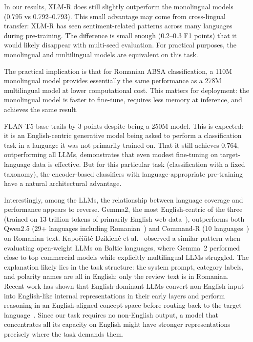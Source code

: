 \documentclass[12pt,a4paper]{report}
\begin{document}
In our results, XLM-R does still slightly outperform the monolingual models (0.795 vs 0.792--0.793). This small advantage may come from cross-lingual transfer: XLM-R has seen sentiment-related patterns across many languages during pre-training. The difference is small enough (0.2--0.3 F1 points) that it would likely disappear with multi-seed evaluation. For practical purposes, the monolingual and multilingual models are equivalent on this task.

The practical implication is that for Romanian ABSA classification, a 110M monolingual model provides essentially the same performance as a 278M multilingual model at lower computational cost. This matters for deployment: the monolingual model is faster to fine-tune, requires less memory at inference, and achieves the same result.

FLAN-T5-base trails by 3 points despite being a 250M model. This is expected: it is an English-centric generative model being asked to perform a classification task in a language it was not primarily trained on. That it still achieves 0.764, outperforming all LLMs, demonstrates that even modest fine-tuning on target-language data is effective. But for this particular task (classification with a fixed taxonomy), the encoder-based classifiers with language-appropriate pre-training have a natural architectural advantage.

Interestingly, among the LLMs, the relationship between language coverage and performance appears to reverse. Gemma2, the most English-centric of the three (trained on 13 trillion tokens of primarily English web data~\cite{team2024gemma}), outperforms both Qwen2.5 (29+ languages including Romanian~\cite{hui2024qwen2}) and Command-R (10 languages~\cite{cohere2024commandr}) on Romanian text. Kapo\v{c}i\={u}t\.{e}-Dzikien\.{e} et al.~\cite{kapociute2025baltic} observed a similar pattern when evaluating open-weight LLMs on Baltic languages, where Gemma~2 performed close to top commercial models while explicitly multilingual LLMs struggled. The explanation likely lies in the task structure: the system prompt, category labels, and polarity names are all in English; only the review text is in Romanian. Recent work has shown that English-dominant LLMs convert non-English input into English-like internal representations in their early layers and perform reasoning in an English-aligned concept space before routing back to the target language~\cite{wendler2024llamas, zhao2024multilingualism, schut2025multilingual}. Since our task requires no non-English output, a model that concentrates all its capacity on English might have stronger representations precisely where the task demands them.
\end{document}
